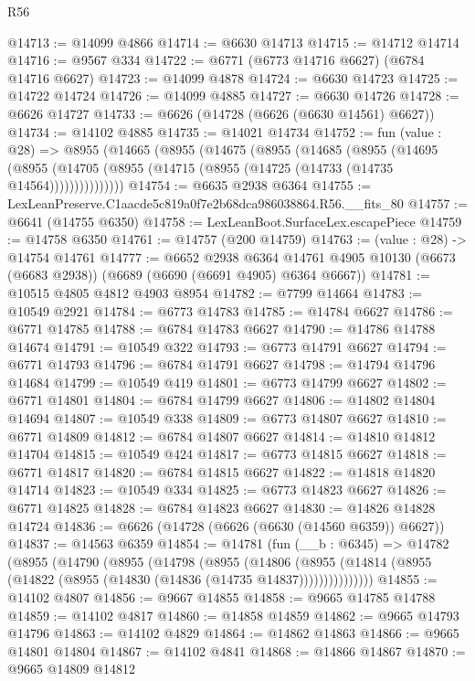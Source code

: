 \begin{lexlean}{R56}
\begin{coremodule}
@14713 := @14099 @4866
@14714 := @6630 @14713
@14715 := @14712 @14714
@14716 := @9567 @334
@14722 := @6771 (@6773 @14716 @6627) (@6784 @14716 @6627)
@14723 := @14099 @4878
@14724 := @6630 @14723
@14725 := @14722 @14724
@14726 := @14099 @4885
@14727 := @6630 @14726
@14728 := @6626 @14727
@14733 := @6626 (@14728 (@6626 (@6630 @14561) @6627))
@14734 := @14102 @4885
@14735 := @14021 @14734
@14752 := fun (value : @28) =>
  @8955
    (@14665
      (@8955
        (@14675
          (@8955
            (@14685
              (@8955
                (@14695
                  (@8955 (@14705 (@8955 (@14715 (@8955 (@14725 (@14733 (@14735 @14564)))))))))))))))
@14754 := @6635 @2938 @6364
@14755 := LexLeanPreserve.C1aacde5c819a0f7e2b68dca986038864.R56.__fits_80
@14757 := @6641 (@14755 @6350)
@14758 := LexLeanBoot.SurfaceLex.escapePiece
@14759 := @14758 @6350
@14761 := @14757 (@200 @14759)
@14763 := (value : @28) -> @14754 @14761
@14777 := @6652
    @2938
    @6364
    @14761
    @4905
    @10130
    (@6673 (@6683 @2938))
    (@6689 (@6690 (@6691 @4905) @6364 @6667))
@14781 := @10515 @4805 @4812 @4903 @8954
@14782 := @7799 @14664
@14783 := @10549 @2921
@14784 := @6773 @14783
@14785 := @14784 @6627
@14786 := @6771 @14785
@14788 := @6784 @14783 @6627
@14790 := @14786 @14788 @14674
@14791 := @10549 @322
@14793 := @6773 @14791 @6627
@14794 := @6771 @14793
@14796 := @6784 @14791 @6627
@14798 := @14794 @14796 @14684
@14799 := @10549 @419
@14801 := @6773 @14799 @6627
@14802 := @6771 @14801
@14804 := @6784 @14799 @6627
@14806 := @14802 @14804 @14694
@14807 := @10549 @338
@14809 := @6773 @14807 @6627
@14810 := @6771 @14809
@14812 := @6784 @14807 @6627
@14814 := @14810 @14812 @14704
@14815 := @10549 @424
@14817 := @6773 @14815 @6627
@14818 := @6771 @14817
@14820 := @6784 @14815 @6627
@14822 := @14818 @14820 @14714
@14823 := @10549 @334
@14825 := @6773 @14823 @6627
@14826 := @6771 @14825
@14828 := @6784 @14823 @6627
@14830 := @14826 @14828 @14724
@14836 := @6626 (@14728 (@6626 (@6630 (@14560 @6359)) @6627))
@14837 := @14563 @6359
@14854 := @14781
    (fun (__b : @6345) =>
    @14782
      (@8955
        (@14790
          (@8955
            (@14798
              (@8955
                (@14806
                  (@8955 (@14814 (@8955 (@14822 (@8955 (@14830 (@14836 (@14735 @14837)))))))))))))))
@14855 := @14102 @4807
@14856 := @9667 @14855
@14858 := @9665 @14785 @14788
@14859 := @14102 @4817
@14860 := @14858 @14859
@14862 := @9665 @14793 @14796
@14863 := @14102 @4829
@14864 := @14862 @14863
@14866 := @9665 @14801 @14804
@14867 := @14102 @4841
@14868 := @14866 @14867
@14870 := @9665 @14809 @14812

\end{coremodule}
\end{lexlean}
